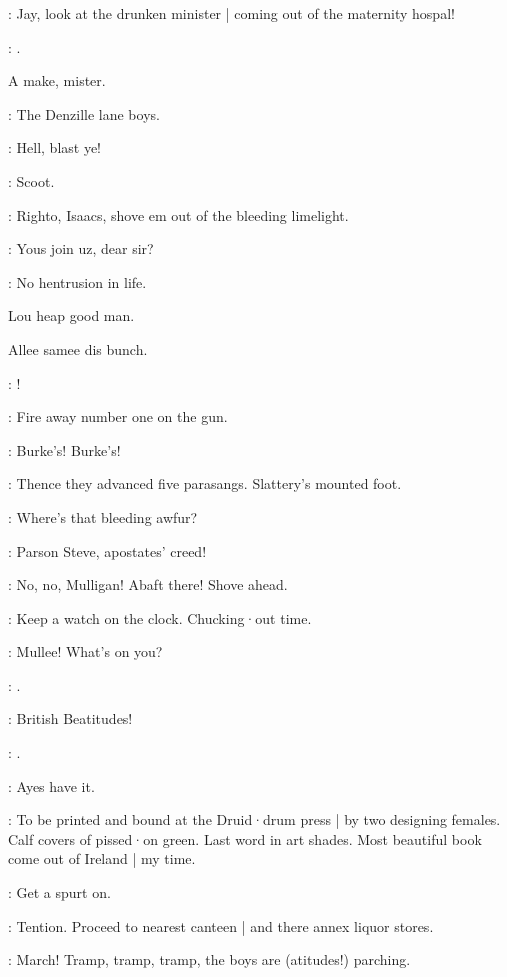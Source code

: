 \bystander:
Jay,
look at the drunken minister |
coming out of the maternity hospal!

\mulligan:
.

\bystander
A make,
mister.

\dixon:
The Denzille lane boys.

\crotthers:
Hell,
blast ye!

\madden:
Scoot.

\barman:
Righto,
Isaacs,
shove em out of the bleeding limelight.

\punch:
Yous join uz,
dear sir?

\lynch:
No hentrusion in life.

\begin{omitted}
Lou heap good man.

Allee samee dis bunch.
\end{omitted}

\bannon:
!

\lenehan:
Fire away number one on the gun.

\All:
Burke's!
Burke's!

:
Thence they advanced five parasangs.
Slattery's mounted foot.

\crotthers:
Where's that bleeding awfur?

\dixon:
Parson Steve,
apostates' creed!

\lynch:
No,
no,
Mulligan!
Abaft there!
Shove ahead.

\lenehan:
Keep a watch on the clock.
Chucking·out time.

\madden:
Mullee!
What's on you?

\mulligan:
.

\bannon:
British Beatitudes!

\mulligan:
.

\punch:
Ayes have it.

\stephen:
To be printed and bound at the Druid·drum press |
by two designing females.
Calf covers of pissed·on green.
Last word in art shades.
Most beautiful book come out of Ireland |
my time.

\crotthers:
\/
Get a spurt on.

\lenehan:
Tention.
Proceed to nearest canteen |
and there annex liquor stores.

\punch:
March!
Tramp,
tramp,
tramp,
the boys are
(atitudes!)
parching.

